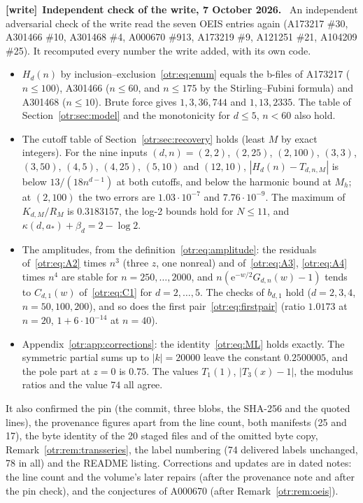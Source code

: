 \documentclass[11pt,a4paper]{article}
\theoremstyle{definition}\newtheorem{definition}[theorem]{Definition}
\theoremstyle{remark}\newtheorem{remark}[theorem]{Remark}
\newcommand{\e}{\mathrm e}
\newenvironment{writenote}[1][]{\par\smallskip\begingroup\small
 \noindent\textbf{[write]}\if\relax\detokenize{#1}\relax\else~\textbf{#1.}\fi\ }%
 {\par\endgroup\smallskip}
\begin{document}
\begin{writenote}[Independent check of the write, 7 October 2026]
An independent adversarial check of the write read the seven OEIS entries
again (A173217 \#30, A301466 \#10, A301468 \#4, A000670 \#913, A173219 \#9,
A121251 \#21, A104209 \#25). It recomputed every number the write added, with
its own code.
\begin{itemize}
\item $H_d(n)$ by inclusion--exclusion~\eqref{otr:eq:enum} equals the b-files
of A173217 ($n\le100$), A301466 ($n\le60$, and $n\le175$ by the
Stirling--Fubini formula) and A301468 ($n\le10$). Brute force gives
$1,3,36,744$ and $1,13,2335$. The table of Section~\ref{otr:sec:model} and
the monotonicity for $d\le5$, $n<60$ also hold.
\item The cutoff table of Section~\ref{otr:sec:recovery} holds (least $M$ by
exact integers). For the nine inputs $(d,n)=(2,2)$, $(2,25)$, $(2,100)$, $(3,3)$, $(3,50)$, $(4,5)$, $(4,25)$, $(5,10)$ and $(12,10)$,
$|H_d(n)-T_{d,n,M}|$ is below $13/(18n^{d-1})$ at both cutoffs, and below
the harmonic bound at $M_h$; at $(2,100)$ the two errors are
$1.03\cdot10^{-7}$ and $7.76\cdot10^{-9}$. The maximum of $K_{d,M}/R_M$ is
$0.3183157$, the log-2 bounds hold for $N\le11$, and $\kappa(d,a_*)+\beta_d=2-\log2$.
\item The amplitudes, from the definition~\eqref{otr:eq:amplitude}: the
residuals of~\eqref{otr:eq:A2} times $n^3$ (three $z$, one nonreal) and
of~\eqref{otr:eq:A3}, \eqref{otr:eq:A4} times $n^4$ are stable for
$n=250,\ldots,2000$, and $n(\e^{-w/2}G_{d,n}(w)-1)$ tends to $C_{d,1}(w)$
of~\eqref{otr:eq:C1} for $d=2,\ldots,5$. The checks of $b_{d,1}$ hold
($d=2,3,4$, $n=50,100,200$), and so does the first pair~\eqref{otr:eq:firstpair}
(ratio $1.0173$ at $n=20$, $1+6\cdot10^{-14}$ at $n=40$).
\item Appendix~\ref{otr:app:corrections}: the identity~\eqref{otr:eq:ML}
holds exactly. The symmetric partial sums up to $|k|=20000$ leave the
constant $0.2500005$, and the pole part at $z=0$ is $0.75$. The values
$T_1(1)$, $|T_3(x)-1|$, the modulus ratios and the value $74$ all agree.
\end{itemize}
It also confirmed the pin (the commit, three blobs, the SHA-256 and the quoted
lines), the provenance figures apart from the line count, both manifests (25
and 17), the byte identity of the 20 staged files and of the omitted byte copy,
Remark~\ref{otr:rem:transseries}, the label numbering (74 delivered labels
unchanged, 78 in all) and the README listing. Corrections and updates are in
dated notes: the line count and the volume's later repairs (after the
provenance note and after the pin check), and the conjectures of A000670
(after Remark~\ref{otr:rem:oeis}).
\end{writenote}
\end{document}
